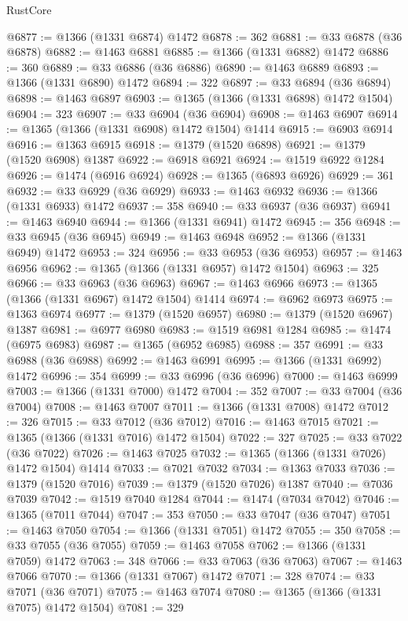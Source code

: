 \begin{lexlean}{RustCore}
\begin{coremodule}
@6877 := @1366 (@1331 @6874) @1472
@6878 := 362
@6881 := @33 @6878 (@36 @6878)
@6882 := @1463 @6881
@6885 := @1366 (@1331 @6882) @1472
@6886 := 360
@6889 := @33 @6886 (@36 @6886)
@6890 := @1463 @6889
@6893 := @1366 (@1331 @6890) @1472
@6894 := 322
@6897 := @33 @6894 (@36 @6894)
@6898 := @1463 @6897
@6903 := @1365 (@1366 (@1331 @6898) @1472 @1504)
@6904 := 323
@6907 := @33 @6904 (@36 @6904)
@6908 := @1463 @6907
@6914 := @1365 (@1366 (@1331 @6908) @1472 @1504) @1414
@6915 := @6903 @6914
@6916 := @1363 @6915
@6918 := @1379 (@1520 @6898)
@6921 := @1379 (@1520 @6908) @1387
@6922 := @6918 @6921
@6924 := @1519 @6922 @1284
@6926 := @1474 (@6916 @6924)
@6928 := @1365 (@6893 @6926)
@6929 := 361
@6932 := @33 @6929 (@36 @6929)
@6933 := @1463 @6932
@6936 := @1366 (@1331 @6933) @1472
@6937 := 358
@6940 := @33 @6937 (@36 @6937)
@6941 := @1463 @6940
@6944 := @1366 (@1331 @6941) @1472
@6945 := 356
@6948 := @33 @6945 (@36 @6945)
@6949 := @1463 @6948
@6952 := @1366 (@1331 @6949) @1472
@6953 := 324
@6956 := @33 @6953 (@36 @6953)
@6957 := @1463 @6956
@6962 := @1365 (@1366 (@1331 @6957) @1472 @1504)
@6963 := 325
@6966 := @33 @6963 (@36 @6963)
@6967 := @1463 @6966
@6973 := @1365 (@1366 (@1331 @6967) @1472 @1504) @1414
@6974 := @6962 @6973
@6975 := @1363 @6974
@6977 := @1379 (@1520 @6957)
@6980 := @1379 (@1520 @6967) @1387
@6981 := @6977 @6980
@6983 := @1519 @6981 @1284
@6985 := @1474 (@6975 @6983)
@6987 := @1365 (@6952 @6985)
@6988 := 357
@6991 := @33 @6988 (@36 @6988)
@6992 := @1463 @6991
@6995 := @1366 (@1331 @6992) @1472
@6996 := 354
@6999 := @33 @6996 (@36 @6996)
@7000 := @1463 @6999
@7003 := @1366 (@1331 @7000) @1472
@7004 := 352
@7007 := @33 @7004 (@36 @7004)
@7008 := @1463 @7007
@7011 := @1366 (@1331 @7008) @1472
@7012 := 326
@7015 := @33 @7012 (@36 @7012)
@7016 := @1463 @7015
@7021 := @1365 (@1366 (@1331 @7016) @1472 @1504)
@7022 := 327
@7025 := @33 @7022 (@36 @7022)
@7026 := @1463 @7025
@7032 := @1365 (@1366 (@1331 @7026) @1472 @1504) @1414
@7033 := @7021 @7032
@7034 := @1363 @7033
@7036 := @1379 (@1520 @7016)
@7039 := @1379 (@1520 @7026) @1387
@7040 := @7036 @7039
@7042 := @1519 @7040 @1284
@7044 := @1474 (@7034 @7042)
@7046 := @1365 (@7011 @7044)
@7047 := 353
@7050 := @33 @7047 (@36 @7047)
@7051 := @1463 @7050
@7054 := @1366 (@1331 @7051) @1472
@7055 := 350
@7058 := @33 @7055 (@36 @7055)
@7059 := @1463 @7058
@7062 := @1366 (@1331 @7059) @1472
@7063 := 348
@7066 := @33 @7063 (@36 @7063)
@7067 := @1463 @7066
@7070 := @1366 (@1331 @7067) @1472
@7071 := 328
@7074 := @33 @7071 (@36 @7071)
@7075 := @1463 @7074
@7080 := @1365 (@1366 (@1331 @7075) @1472 @1504)
@7081 := 329

\end{coremodule}
\end{lexlean}
